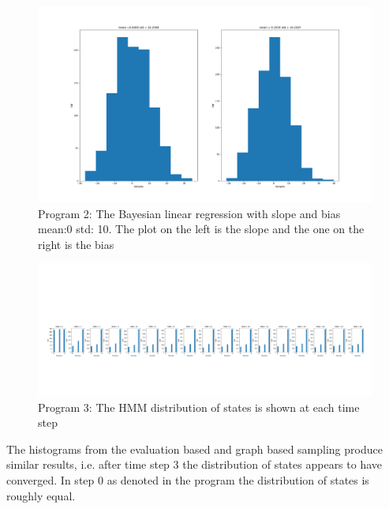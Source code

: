 \documentclass[]{article}
\begin{document}
\begin{figure}[h]
	\begin{center}
		\includegraphics[width=\textwidth]{Graph/BayesianLinearReg.png}
		\caption{Program 2: The Bayesian linear regression with slope and bias mean:0 std: 10. The plot on the left is the slope and the one on the right is the bias}
	\end{center}
\end{figure}
\begin{figure}[h]
	\begin{center}
		\includegraphics[width=\textwidth]{Graph/HMM.png}
		\caption{Program 3: The HMM distribution of states is shown at each time step}
	\end{center}
\end{figure}
The histograms from the evaluation based and graph based sampling produce similar results, i.e. after time step 3 the distribution of states appears to have converged. In step 0 as denoted in the program the distribution of states is roughly equal.
\end{document}

